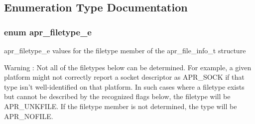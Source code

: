 \subsection{Enumeration Type Documentation}
\hypertarget{group__apr__file__info_gae3f0ce3014337a52b39852f8bf81ca7c}{
\subsubsection[{apr\-\_\-filetype\-\_\-e}]{\setlength{\rightskip}{0pt plus 5cm}enum {\bf apr\-\_\-filetype\-\_\-e}}}\label{group__apr__file__info_gae3f0ce3014337a52b39852f8bf81ca7c}
apr\-\_\-filetype\-\_\-e values for the filetype member of the apr\-\_\-file\-\_\-info\-\_\-t structure \begin{DoxyWarning}{Warning}
\-: Not all of the filetypes below can be determined. For example, a given platform might not correctly report a socket descriptor as A\-P\-R\-\_\-\-S\-O\-C\-K if that type isn't well-\/identified on that platform. In such cases where a filetype exists but cannot be described by the recognized flags below, the filetype will be A\-P\-R\-\_\-\-U\-N\-K\-F\-I\-L\-E. If the filetype member is not determined, the type will be A\-P\-R\-\_\-\-N\-O\-F\-I\-L\-E. 
\end{DoxyWarning}

